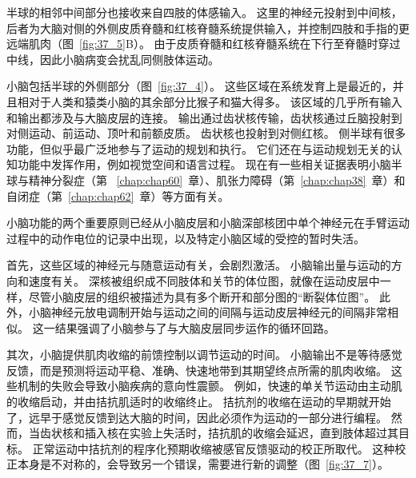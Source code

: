 半球的相邻中间部分也接收来自四肢的体感输入。
这里的神经元投射到中间核，后者为大脑对侧的外侧皮质脊髓和红核脊髓系统提供输入，并控制四肢和手指的更远端肌肉（图~\ref{fig:37_5}B）。
由于皮质脊髓和红核脊髓系统在下行至脊髓时穿过中线，因此小脑病变会扰乱同侧肢体运动。


小脑包括半球的外侧部分（图~\ref{fig:37_4}）。 这些区域在系统发育上是最近的，并且相对于人类和猿类小脑的其余部分比猴子和猫大得多。
该区域的几乎所有输入和输出都涉及与大脑皮层的连接。
输出通过齿状核传输，齿状核通过丘脑投射到对侧运动、前运动、顶叶和前额皮质。
齿状核也投射到对侧红核。
侧半球有很多功能，但似乎最广泛地参与了运动的规划和执行。
它们还在与运动规划无关的认知功能中发挥作用，例如视觉空间和语言过程。
现在有一些相关证据表明小脑半球与精神分裂症（第 ~\ref{chap:chap60}~章）、肌张力障碍（第~\ref{chap:chap38}~章）和自闭症（第~\ref{chap:chap62}~章）等方面有关。


小脑功能的两个重要原则已经从小脑皮层和小脑深部核团中单个神经元在手臂运动过程中的动作电位的记录中出现，以及特定小脑区域的受控的暂时失活。


首先，这些区域的神经元与随意运动有关，会剧烈激活。
小脑输出量与运动的方向和速度有关。
深核被组织成不同肢体和关节的体位图，就像在运动皮层中一样，尽管小脑皮层的组织被描述为具有多个断开和部分图的“断裂体位图”。
此外，小脑神经元放电调制开始与运动之间的间隔与运动皮层神经元的间隔非常相似。
这一结果强调了小脑参与了与大脑皮层同步运作的循环回路。


其次，小脑提供肌肉收缩的前馈控制以调节运动的时间。
小脑输出不是等待感觉反馈，而是预测将运动平稳、准确、快速地带到其期望终点所需的肌肉收缩。
这些机制的失败会导致小脑疾病的意向性震颤。
例如，快速的单关节运动由主动肌的收缩启动，并由拮抗肌适时的收缩终止。
拮抗剂的收缩在运动的早期就开始了，远早于感觉反馈到达大脑的时间，因此必须作为运动的一部分进行编程。
然而，当齿状核和插入核在实验上失活时，拮抗肌的收缩会延迟，直到肢体超过其目标。
正常运动中拮抗剂的程序化预期收缩被感官反馈驱动的校正所取代。
这种校正本身是不对称的，会导致另一个错误，需要进行新的调整（图~\ref{fig:37_7}）。


